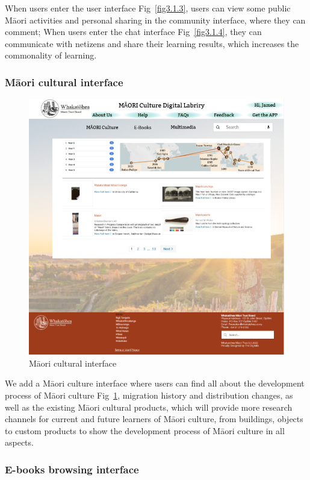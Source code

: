 When users enter the user interface Fig~\ref{fig3.1.3}, users can view some public Māori activities and personal sharing in the community interface, where they can comment; When users enter the chat interface Fig~\ref{fig3.1.4}, they can communicate with netizens and share their learning results, which increases the commonality of learning.

\subsubsection{Māori cultural interface}

\begin{figure}[htbp]
  \centerline{\includegraphics[width=400pt]{images/3-1-3.png}}
  \caption{Māori cultural interface}
  \label{fig3.1.5}
\end{figure}

We add a Māori culture interface where users can find all about the development process of Māori culture Fig~\ref{fig3.1.5}, migration history and distribution changes, as well as the existing Māori cultural products, which will provide more research channels for current and future learners of Māori culture, from buildings, objects to custom products to show the development process of Māori culture in all aspects\cite{MāoriCul4:online}.

\subsubsection{E-books browsing interface}


